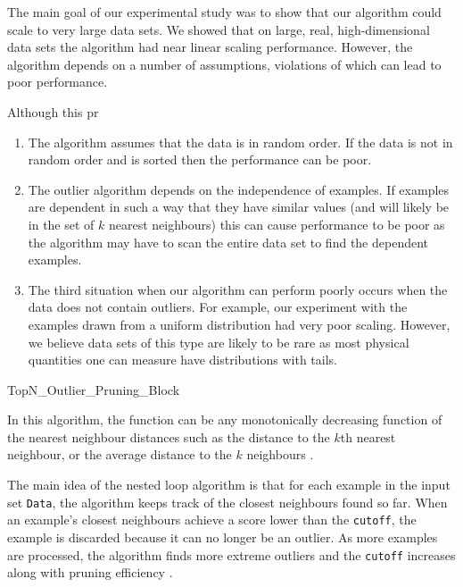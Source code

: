 The main goal of our experimental study was to show that our algorithm could
scale to very large data sets. We showed that on large, real, high-dimensional
data sets the algorithm had near linear scaling performance. However, the
algorithm depends on a number of assumptions, violations of which can lead to
poor performance.

Although this pr

\begin{enumerate}
    \item The algorithm assumes that the data is in random order. If the data is
        not in random order and is sorted then the performance can be poor.
    \item The outlier algorithm depends on the independence of examples. If
        examples are dependent in such a way that they have similar values (and
        will likely be in the set of $k$ nearest neighbours) this can cause
        performance to be poor as the algorithm may have to scan the entire data
        set to find the dependent examples.
    \item The third situation when our algorithm can perform poorly occurs when
        the data does not contain outliers. For example, our experiment with the
        examples drawn from a uniform distribution had very poor scaling.
        However, we believe data sets of this type are likely to be rare as most
        physical quantities one can measure have distributions with tails.
\end{enumerate}





\begin{algorithm}
    
    \caption{TopN\_Outlier\_Pruning\_Block}
    \label{algm:TopNOutlierPruningBlock}
\end{algorithm}

In this algorithm, the  function can be any monotonically
decreasing function of the nearest neighbour distances such as the distance to
the $k$th nearest neighbour, or the average distance to the $k$ neighbours
\cite{Bay:2003}.

The main idea of the nested loop algorithm is that for each example in the
input set \verb+Data+, the algorithm keeps track of the closest neighbours found
so far. When an example's closest neighbours achieve a score lower than the
\verb+cutoff+, the example is discarded because it can no longer be an outlier.
As more examples are processed, the algorithm finds more extreme outliers and
the \verb+cutoff+ increases along with pruning efficiency \cite{Bay:2003}.

